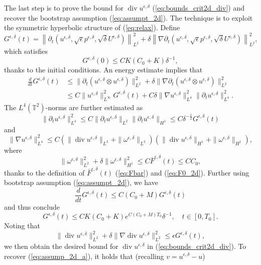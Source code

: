 \documentclass[reqno,10pt]{amsart}
\theoremstyle{definition}
\theoremstyle{remark}
\numberwithin{equation}{section}
\DeclareMathOperator{\dive}{div}
\begin{document}
The last step is to prove the bound for $\dive u^{\epsilon,\delta}$ (\ref{eq:bounds_crit2d_div}) and recover the bootstrap assumption (\ref{eq:assumpt_2d}). The technique is to exploit the symmetric hyperbolic structure of (\ref{eq:relax}). Define
\[
    G^{\epsilon,\delta}(t) = \left \| \partial_t \left( u^{\epsilon,\delta}, \sqrt\epsilon p^{\epsilon,\delta}, \sqrt\delta U^{\epsilon,\delta} \right) \right\|_{L^2}^2 + \delta \left \| \nabla \partial_t \left( u^{\epsilon,\delta}, \sqrt\epsilon p^{\epsilon,\delta}, \sqrt\delta U^{\epsilon,\delta} \right) \right\|_{L^2}^2,
\]
which satisfies
\[
    G^{\epsilon,\delta}(0) \le CK(C_0+K)\delta^{-1},
\]
thanks to the initial conditions. An energy estimate implies that
\[
\begin{aligned}
    \frac{d}{dt}G^{\epsilon,\delta}(t) &\le \| \partial_t (u^{\epsilon,\delta}\otimes u^{\epsilon,\delta}) \|_{L^2}^2 + \delta\| \nabla\partial_t (u^{\epsilon,\delta}\otimes u^{\epsilon,\delta}) \|_{L^2}^2 \\
    &\le C \| u^{\epsilon,\delta} \|_{L^\infty}^2 G^{\epsilon,\delta}(t) + C\delta \|\nabla u^{\epsilon,\delta}\|_{L^4}^2 \|\partial_t u^{\epsilon,\delta}\|_{L^4}^2.
\end{aligned}
\]
The $L^4(\mathbb T^2)$-norms are further estimated as
\[
    \|\partial_t u^{\epsilon,\delta}\|_{L^4}^2 \le C \|\partial_t u^{\epsilon,\delta}\|_{L^2} \|\partial_t u^{\epsilon,\delta}\|_{H^1} \le C\delta^{-\frac{1}{2}} G^{\epsilon,\delta}(t)
\]
and
\[
    \|\nabla u^{\epsilon,\delta}\|_{L^4}^2 \le C \left( \|\dive u^{\epsilon,\delta}\|_{L^2} + \|\omega^{\epsilon,\delta}\|_{L^2} \right) \left( \|\dive u^{\epsilon,\delta}\|_{H^1} + \|\omega^{\epsilon,\delta}\|_{H^1} \right),
\]
where
\[
    \|\omega^{\epsilon,\delta}\|_{L^2}^2 + \delta \|\omega^{\epsilon,\delta}\|_{H^1}^2 \le C \bar F^{\epsilon,\delta}(t) \le CC_0,
\]
thanks to the definition of $\bar F^{\epsilon,\delta}(t)$ (\ref{eq:Fbar}) and (\ref{eq:F0_2d}). Further using bootstrap assumption (\ref{eq:assumpt_2d}), we have
\[
    \frac{d}{dt}G^{\epsilon,\delta}(t) \le C(C_0+M)G^{\epsilon,\delta}(t)
\]
and thus conclude
\[
    G^{\epsilon,\delta}(t) \le CK(C_0+K) e^{C(C_0+M)T_0}\delta^{-1}, \quad t\in[0,T_0].
\]
Noting that
\begin{equation} \label{eq:2d_G_use}
    \|\dive u^{\epsilon,\delta}\|_{L^2}^2 + \delta \|\nabla \dive u^{\epsilon,\delta}\|_{L^2}^2 \le \epsilon G^{\epsilon,\delta}(t),
\end{equation}
we then obtain the desired bound for $\dive u^{\epsilon,\delta}$ in (\ref{eq:bounds_crit2d_div}). To recover (\ref{eq:assump_2d_a}), it holds that (recalling $v=u^{\epsilon,\delta}-u$)
\end{document}
